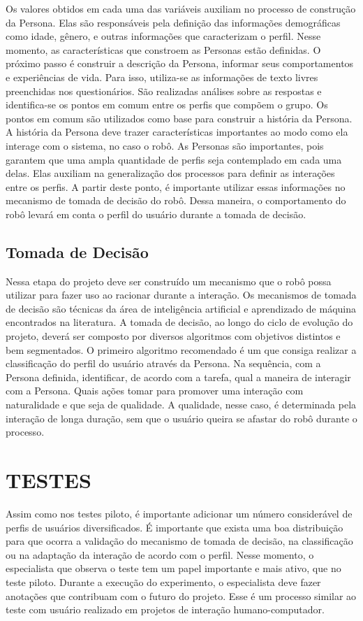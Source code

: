 Os valores obtidos em cada uma das variáveis auxiliam no processo de construção da Persona. Elas são responsáveis pela definição das informações demográficas como idade, gênero, e outras informações que caracterizam o perfil. Nesse momento, as características que constroem as Personas estão definidas. O próximo passo é construir a descrição da Persona, informar seus comportamentos e experiências de vida. Para isso, utiliza-se as informações de texto livres preenchidas nos questionários. São realizadas análises sobre as respostas e identifica-se os pontos em comum entre os perfis que compõem o grupo. Os pontos em comum são utilizados como base para construir a história da Persona. A história da Persona deve trazer características importantes ao modo como ela interage com o sistema, no caso o robô. As Personas são importantes, pois garantem que uma ampla quantidade de perfis seja contemplado em cada uma delas. Elas auxiliam na generalização dos processos para definir as interações entre os perfis. A partir deste ponto, é importante utilizar essas informações no mecanismo de tomada de decisão do robô. Dessa maneira, o comportamento do robô levará em conta o perfil do usuário durante a tomada de decisão.

\subsection{Tomada de Decisão}
\label{sec:tomadadecisao}
Nessa etapa do projeto deve ser construído um mecanismo que o robô possa utilizar para fazer uso ao racionar durante a interação. Os mecanismos de tomada de decisão são técnicas da área de inteligência artificial e aprendizado de máquina encontrados na literatura. A tomada de decisão, ao longo do ciclo de evolução do projeto, deverá ser composto por diversos algoritmos com objetivos distintos e bem segmentados. O primeiro algoritmo recomendado é um que consiga realizar a classificação do perfil do usuário através da Persona. Na sequência, com a Persona definida, identificar, de acordo com a tarefa, qual a maneira de interagir com a Persona. Quais ações tomar para promover uma interação com naturalidade e que seja de qualidade. A qualidade, nesse caso, é determinada pela interação de longa duração, sem que o usuário queira se afastar do robô durante o processo.

\section{TESTES}
\label{sec:testes}
Assim como nos testes piloto, é importante adicionar um número considerável de perfis de usuários diversificados. É importante que exista uma boa distribuição para que ocorra a validação do mecanismo de tomada de decisão, na classificação ou na adaptação da interação de acordo com o perfil. Nesse momento, o especialista que observa o teste tem um papel importante e mais ativo, que no teste piloto. Durante a execução do experimento, o especialista deve fazer anotações que contribuam com o futuro do projeto. Esse é um processo similar ao teste com usuário realizado em projetos de interação humano-computador. 

